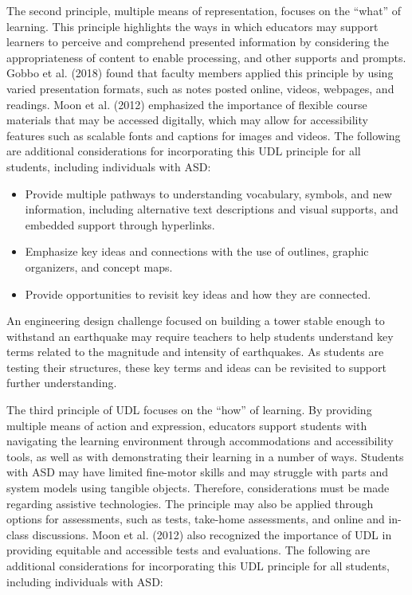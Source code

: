 \documentclass[11.5pt]{sig-alternate}
\begin{document}
\begin{large}
The second principle, multiple means of representation, focuses on the “what” of learning. This principle highlights the ways in which educators may support learners to perceive and comprehend presented information by considering the appropriateness of content to enable processing, and other supports and prompts. Gobbo et al. (2018) found that faculty members applied this principle by using varied presentation formats, such as notes posted online, videos, webpages, and readings. Moon et al. (2012) emphasized the importance of flexible course materials that may be accessed digitally, which may allow for accessibility features such as scalable fonts and captions for images and videos. The following are additional considerations for incorporating this UDL principle for all students, including individuals with ASD:

\begin{itemize}
    \item Provide multiple pathways to understanding vocabulary, symbols, and new information, including alternative text descriptions and visual supports, and embedded support through hyperlinks.
    \item Emphasize key ideas and connections with the use of outlines, graphic organizers, and concept maps.
    \item Provide opportunities to revisit key ideas and how they are connected.
\end{itemize}

An engineering design challenge focused on building a tower stable enough to withstand an earthquake may require teachers to help students understand key terms related to the magnitude and intensity of earthquakes. As students are testing their structures, these key terms and ideas can be revisited to support further understanding. 

The third principle of UDL focuses on the “how” of learning. By providing multiple means of action and expression, educators support students with navigating the learning environment through accommodations and accessibility tools, as well as with demonstrating their learning in a number of ways. Students with ASD may have limited fine-motor skills and may struggle with parts and system models using tangible objects. Therefore, considerations must be made regarding assistive technologies. The principle may also be applied through options for assessments, such as tests, take-home assessments, and online and in-class discussions. Moon et al. (2012) also recognized the importance of UDL in providing equitable and accessible tests and evaluations. The following are additional considerations for incorporating this UDL principle for all students, including individuals with ASD:


\end{large}
\end{document}
